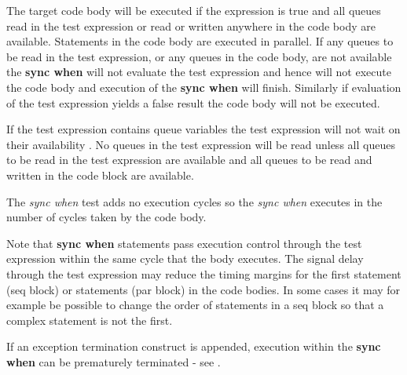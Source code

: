             The target code body will be executed if the expression is true and all
            queues read in the test expression or read or written anywhere in the
            code body are available. Statements in the code body are executed in
            parallel. If any queues to be read in the test expression, or any queues
            in the code body, are not available the {\bf sync when} will not
            evaluate the test expression and hence will not execute the code body
            and execution of the {\bf sync when} will finish. Similarly if
            evaluation of the test expression yields a false result the code body
            will not be executed.

            If the test expression contains queue variables the test expression
            will not wait on their availability . No
            queues in the test expression will be read unless all queues to be
            read in the test expression are available and all queues to be read
            and written in the code block are available.

            The {\em sync when} test adds no execution cycles so the {\em sync
            when} executes in the number of cycles taken by the code body.

            Note that {\bf sync when} statements pass execution control
            through the test expression within the same cycle that the body
            executes. The signal delay through the test expression may reduce
            the timing margins for the first statement (seq block) or statements
            (par block) in the code bodies. In some cases it may for example
            be possible to change the order of statements in a seq block so that
            a complex statement is not the first.
                    
            If an exception termination construct is appended, execution within
            the {\bf sync when} can be prematurely terminated
            - see .
            
